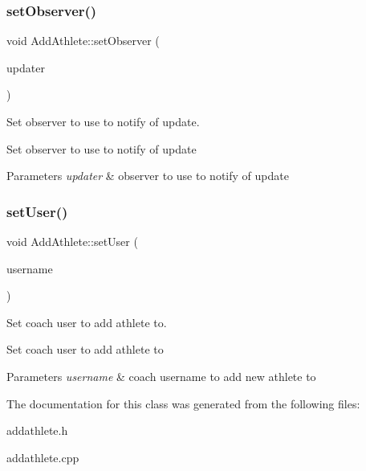 \subsubsection{\texorpdfstring{setObserver()}{setObserver()}}
{\footnotesize\ttfamily void Add\+Athlete\+::set\+Observer (\begin{DoxyParamCaption}\item[{\mbox{\hyperlink{classFileUpdater}{File\+Updater}} $\ast$}]{updater }\end{DoxyParamCaption})}



Set observer to use to notify of update. 

Set observer to use to notify of update 
\begin{DoxyParams}{Parameters}
{\em updater} & observer to use to notify of update \\
\hline
\end{DoxyParams}
\mbox{\label{classAddAthlete_a5f56e55bedf5f879ca84f05eba60d2c2}} 
\subsubsection{\texorpdfstring{setUser()}{setUser()}}
{\footnotesize\ttfamily void Add\+Athlete\+::set\+User (\begin{DoxyParamCaption}\item[{std\+::string}]{username }\end{DoxyParamCaption})}



Set coach user to add athlete to. 

Set coach user to add athlete to 
\begin{DoxyParams}{Parameters}
{\em username} & coach username to add new athlete to \\
\hline
\end{DoxyParams}


The documentation for this class was generated from the following files\+:\begin{DoxyCompactItemize}
\item 
addathlete.\+h\item 
addathlete.\+cpp\end{DoxyCompactItemize}
